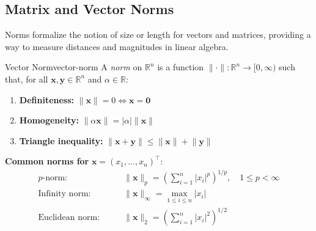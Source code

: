 \subsection{Matrix and Vector Norms}
Norms formalize the notion of size or length for vectors and matrices, providing a way to measure distances and magnitudes in linear algebra.
\begin{definition}{Vector Norm}{vector-norm}
    A \emph{norm} on \(\mathbb{R}^n\) is a function \(\lVert \cdot \rVert : \mathbb{R}^n \to [0, \infty)\) such that, for all \(\mathbf{x}, \mathbf{y} \in \mathbb{R}^n\) and \(\alpha \in \mathbb{R}\):
    \begin{enumerate}[nosep]
        \item \textbf{Definiteness:} \(\lVert \mathbf{x} \rVert = 0 \iff \mathbf{x} = \mathbf{0}\)
        \item \textbf{Homogeneity:} \(\lVert \alpha \mathbf{x} \rVert = |\alpha| \lVert \mathbf{x} \rVert\)
        \item \textbf{Triangle inequality:} \(\lVert \mathbf{x} + \mathbf{y} \rVert \leq \lVert \mathbf{x} \rVert + \lVert \mathbf{y} \rVert\)
    \end{enumerate}
    \medskip
    \noindent
    \textbf{Common norms for} \(\mathbf{x} = (x_1, \dots, x_n)^\top\):
    \begin{align*}
        \text{\(p\)-norm:} \qquad     & \lVert \mathbf{x} \rVert_p = \left( \sum_{i=1}^n |x_i|^p \right)^{1/p}, \quad 1 \leq p < \infty \\[0.5em]
        \text{Infinity norm:} \qquad  & \lVert \mathbf{x} \rVert_\infty = \max_{1 \leq i \leq n} |x_i|                                  \\[0.5em]
        \text{Euclidean norm:} \qquad & \lVert \mathbf{x} \rVert_2 = \left( \sum_{i=1}^n |x_i|^2 \right)^{1/2}
    \end{align*}
\end{definition}

